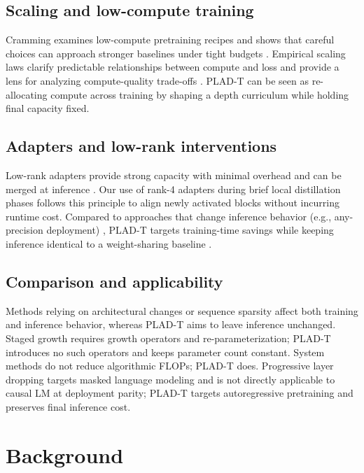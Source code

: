 \documentclass{article}
\begin{document}
\subsection{Scaling and low-compute training}
Cramming examines low-compute pretraining recipes and shows that careful choices can approach stronger baselines under tight budgets \cite{geiping-2022-cramming}. Empirical scaling laws clarify predictable relationships between compute and loss and provide a lens for analyzing compute-quality trade-offs \cite{henighan-2020-scaling}. PLAD-T can be seen as re-allocating compute across training by shaping a depth curriculum while holding final capacity fixed.

\subsection{Adapters and low-rank interventions}
Low-rank adapters provide strong capacity with minimal overhead and can be merged at inference \cite{miles-2024-velora}. Our use of rank-4 adapters during brief local distillation phases follows this principle to align newly activated blocks without incurring runtime cost. Compared to approaches that change inference behavior (e.g., any-precision deployment) \cite{park-2024-any}, PLAD-T targets training-time savings while keeping inference identical to a weight-sharing baseline \cite{liu-2024-mobilellm}.

\subsection{Comparison and applicability}
Methods relying on architectural changes or sequence sparsity \cite{so-2021-searching,kitaev-2020-reformer} affect both training and inference behavior, whereas PLAD-T aims to leave inference unchanged. Staged growth \cite{shen-2022-staged,zou-2024-multi} requires growth operators and re-parameterization; PLAD-T introduces no such operators and keeps parameter count constant. System methods \cite{andoorveedu-2022-tempo,narayanan-2020-memory,jia-2024-toward} do not reduce algorithmic FLOPs; PLAD-T does. Progressive layer dropping \cite{zhang-2020-accelerating} targets masked language modeling and is not directly applicable to causal LM at deployment parity; PLAD-T targets autoregressive pretraining and preserves final inference cost.

\section{Background}
\end{document}
